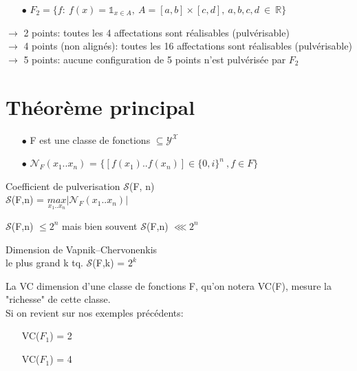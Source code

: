 \documentclass[a4paper]{report}
\begin{document}
\begin{itemize}
\item[$\bullet$] $F_2 = \{f:\ f(x)=\mathds{1}_{x\in A},\ A=[a,b]\times[c,d],\ a,b,c,d\ \in \ \mathds{R}\}$\\
\end{itemize}
$\rightarrow$ 2 points: toutes les 4 affectations sont réalisables (pulvérisable)\\
$\rightarrow$ 4 points (non alignés): toutes les 16 affectations sont réalisables (pulvérisable)\\
$\rightarrow$ 5 points: aucune configuration de 5 points n'est pulvérisée par $F_2$\\


\section{Théorème principal}
\begin{itemize}
\item[$\bullet$] F est une classe de fonctions $ \subseteq \mathcal{Y}^\mathcal{X}$\\
\item[$\bullet$] $\mathcal{N}_F (x_1..x_n)$ = $\{[f(x_1)..f(x_n)]\in \{0,i\}^n \ ,f\in F\}$\\
\end{itemize}

\begin{definition}
Coefficient de pulverisation $\mathcal{S}$(F, n)\\
$\mathcal{S}$(F,n) = $\underset{x_1..x_n}{max}|\mathcal{N}_F (x_1..x_n)|$\\
\end{definition}

\begin{remark}
$\mathcal{S}$(F,n) $ \leq 2^n$ mais bien souvent $\mathcal{S}$(F,n) $ \lll 2^n $\\
\end{remark}

\begin{definition}
Dimension de Vapnik–Chervonenkis\\
le plus grand k tq. $\mathcal{S}$(F,k) = $2^k$\\
\end{definition}

La VC dimension d'une classe de fonctions F, qu'on  notera VC(F), mesure la "richesse" de cette classe.\\
Si on revient sur nos exemples précédents:
\begin{itemize}
\item[]VC($F_1$) = 2
\item[]VC($F_1$) = 4\\
\end{itemize}
\end{document}
